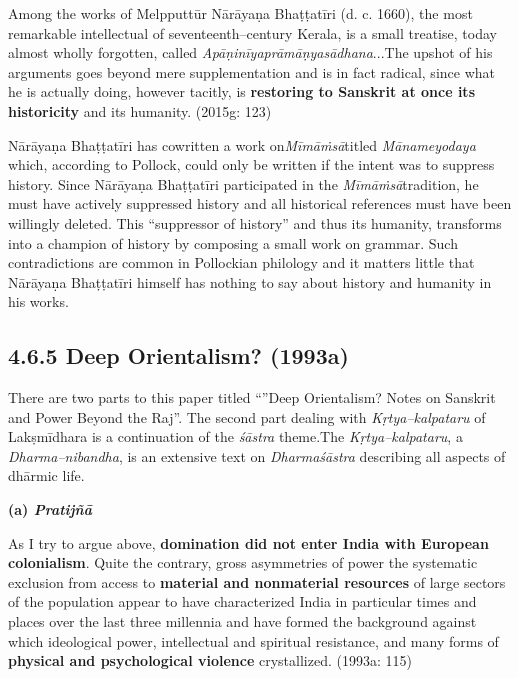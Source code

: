 \begin{myquote}
Among the works of Melpputtūr Nārāyaṇa Bhaṭṭatīri (d. c. 1660), the most remarkable intellectual of seventeenth–century Kerala, is a small treatise, today almost wholly forgotten, called \textit{Apāṇinīyaprāmāṇyasādhana}\-...The upshot of his arguments goes beyond mere supplementation and is in fact radical, since what he is actually doing, however tacitly, is \textbf{restoring to Sanskrit at once its historicity} and its humanity. (2015g: 123)
\end{myquote}

Nārāyaṇa Bhaṭṭatīri has cowritten a work on\textit{Mīmāṁsā}titled \textit{Mānameyodaya }which, according to Pollock, could only be written if the intent was to suppress history. Since Nārāyaṇa Bhaṭṭatīri participated in the \textit{Mīmāṁsā}tradition, he must have actively suppressed history and all historical references must have been willingly deleted. This “suppressor of history” and thus its humanity, transforms into a champion of history by composing a small work on grammar. Such contradictions are common in Pollockian philology and it matters little that Nārāyaṇa Bhaṭṭatīri himself has nothing to say about history and humanity in his works.

\vspace{-.3cm}

\subsection*{4.6.5 Deep Orientalism? (1993a)}

There are two parts to this paper titled “”Deep Orientalism? Notes on Sanskrit and Power Beyond the Raj”. The second part dealing with \textit{Kṛtya–kalpataru }of Lakṣmīdhara is a continuation of the \textit{śāstra} theme.The \textit{Kṛtya–kalpataru}, a \textit{Dharma–nibandha}, is an extensive text on \textit{Dharmaśāstra} describing all aspects of dhārmic life.

\textbf{(a) \textit{Pratijñā }}

\begin{myquote}
As I try to argue above, \textbf{domination did not enter India with European colonialism}. Quite the contrary, gross asymmetries of power the systematic exclusion from access to \textbf{material and nonmaterial resources} of large sectors of the population appear to have characterized India in particular times and places over the last three millennia and have formed the background against which ideological power, intellectual and spiritual resistance, and many forms of \textbf{physical and psychological violence} crystallized. (1993a: 115)
\end{myquote}

